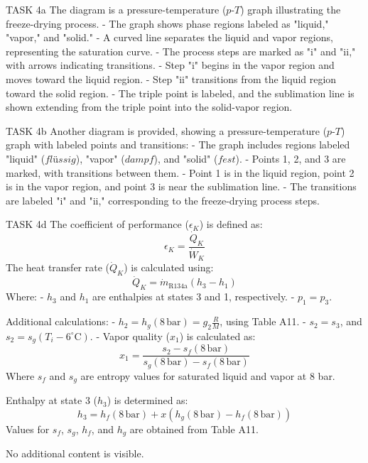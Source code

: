 TASK 4a  
The diagram is a pressure-temperature (\(p\)-\(T\)) graph illustrating the freeze-drying process.  
- The graph shows phase regions labeled as "liquid," "vapor," and "solid."  
- A curved line separates the liquid and vapor regions, representing the saturation curve.  
- The process steps are marked as "i" and "ii," with arrows indicating transitions.  
- Step "i" begins in the vapor region and moves toward the liquid region.  
- Step "ii" transitions from the liquid region toward the solid region.  
- The triple point is labeled, and the sublimation line is shown extending from the triple point into the solid-vapor region.  

TASK 4b  
Another diagram is provided, showing a pressure-temperature (\(p\)-\(T\)) graph with labeled points and transitions:  
- The graph includes regions labeled "liquid" (\(flüssig\)), "vapor" (\(dampf\)), and "solid" (\(fest\)).  
- Points 1, 2, and 3 are marked, with transitions between them.  
- Point 1 is in the liquid region, point 2 is in the vapor region, and point 3 is near the sublimation line.  
- The transitions are labeled "i" and "ii," corresponding to the freeze-drying process steps.  

TASK 4d  
The coefficient of performance (\(\epsilon_K\)) is defined as:  
\[
\epsilon_K = \frac{\dot{Q}_K}{\dot{W}_K}
\]  
The heat transfer rate (\(\dot{Q}_K\)) is calculated using:  
\[
\dot{Q}_K = \dot{m}_{\text{R134a}} \left( h_3 - h_1 \right)
\]  
Where:  
- \(h_3\) and \(h_1\) are enthalpies at states 3 and 1, respectively.  
- \(p_1 = p_3\).  

Additional calculations:  
- \(h_2 = h_g(8 \, \text{bar}) = g_2 \frac{R}{M}\), using Table A11.  
- \(s_2 = s_3\), and \(s_2 = s_g(T_i - 6^\circ\text{C})\).  
- Vapor quality (\(x_1\)) is calculated as:  
\[
x_1 = \frac{s_2 - s_f(8 \, \text{bar})}{s_g(8 \, \text{bar}) - s_f(8 \, \text{bar})}
\]  
Where \(s_f\) and \(s_g\) are entropy values for saturated liquid and vapor at 8 bar.  

Enthalpy at state 3 (\(h_3\)) is determined as:  
\[
h_3 = h_f(8 \, \text{bar}) + x \left( h_g(8 \, \text{bar}) - h_f(8 \, \text{bar}) \right)
\]  
Values for \(s_f\), \(s_g\), \(h_f\), and \(h_g\) are obtained from Table A11.  

No additional content is visible.